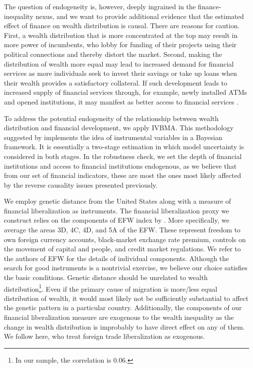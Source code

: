 \documentclass[a4paper,11pt]{article}
\begin{document}
The question of endogeneity is, however, deeply ingrained in the finance-inequality nexus, and we want to provide additional evidence that the estimated effect of finance on wealth distribution is causal. There are reasons for caution. First, a wealth distribution that is more concentrated at the top may result in more power of incumbents, who lobby for funding of their projects using their political connections and thereby distort the market. Second, making the distribution of wealth more equal may lead to increased demand for financial services as more individuals seek to invest their savings or take up loans when their wealth provides a satisfactory collateral. If such development leads to increased supply of financial services through, for example, newly installed ATMs and opened institutions, it may manifest as better access to financial services \citep{beck2007finance}.

To address the potential endogeneity of the relationship between wealth distribution and financial development, we apply \ac{IVBMA}. This methodology suggested by \cite{KarlLenkoski2012} implements the idea of instrumental variables in a Bayesian framework. It is essentially a two-stage estimation in which model uncertainty is considered in both stages. In the robustness check, we set the depth of financial institutions and access to financial institutions endogenous, as we believe that from our set of financial indicators, these are most the ones most likely affected by the reverse causality issues presented previously.

We employ genetic distance from the United States \citep{spolaore2009diffusion} along with a measure of financial liberalization as instruments. The financial liberalization proxy we construct relies on the components of \ac{EFW} index by \citep{gwartney2017}. More specifically, we average the areas 3D, 4C, 4D, and 5A of the \ac{EFW}. These represent freedom to own foreign currency accounts, black-market exchange rate premium, controls on the movement of capital and people, and credit market regulations. We refer to the authors of \ac{EFW} for the details of individual components. Although the search for good instruments is a nontrivial exercise, we believe our choice satisfies the basic conditions. Genetic distance should be unrelated to wealth distribution\footnote{In our sample, the correlation is 0.06.}. Even if the primary cause of migration is more/less equal distribution of wealth, it would most likely not be sufficiently substantial to affect the genetic pattern in a particular country. Additionally, the components of our financial liberalization measure are exogenous to the wealth inequality as the change in wealth distribution is improbably to have direct effect on any of them. We follow \citet{estev} here, who treat foreign trade liberalization as exogenous.
\end{document}
